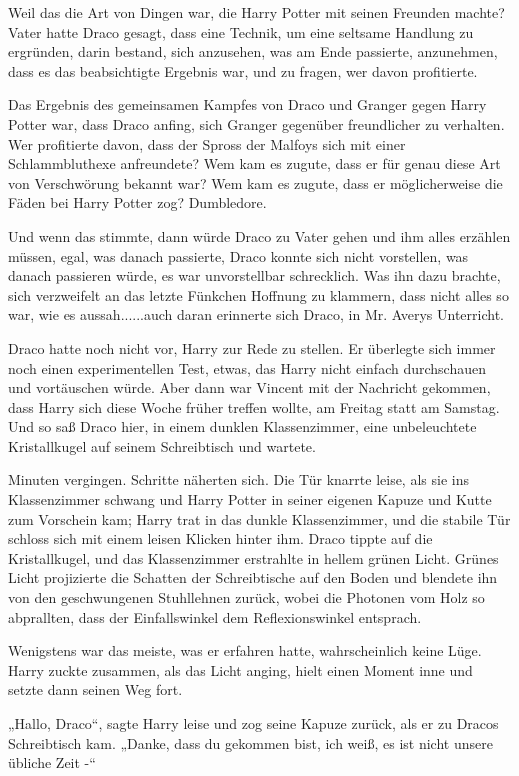 {Weil das die Art von Dingen war, die Harry Potter mit seinen Freunden machte? Vater hatte Draco gesagt, dass eine Technik, um eine seltsame Handlung zu ergründen, darin bestand, sich anzusehen, was am Ende passierte, anzunehmen, dass es das beabsichtigte Ergebnis war, und zu fragen, wer davon profitierte.

Das Ergebnis des gemeinsamen Kampfes von Draco und Granger gegen Harry Potter war, dass Draco anfing, sich Granger gegenüber freundlicher zu verhalten. Wer profitierte davon, dass der Spross der Malfoys sich mit einer Schlammbluthexe anfreundete? Wem kam es zugute, dass er für genau diese Art von Verschwörung bekannt war? Wem kam es zugute, dass er möglicherweise die Fäden bei Harry Potter zog? Dumbledore.

Und wenn das stimmte, dann würde Draco zu Vater gehen und ihm alles erzählen müssen, egal, was danach passierte, Draco konnte sich nicht vorstellen, was danach passieren würde, es war unvorstellbar schrecklich. Was ihn dazu brachte, sich verzweifelt an das letzte Fünkchen Hoffnung zu klammern, dass nicht alles so war, wie es aussah......auch daran erinnerte sich Draco, in Mr. Averys Unterricht.

Draco hatte noch nicht vor, Harry zur Rede zu stellen. Er überlegte sich immer noch einen experimentellen Test, etwas, das Harry nicht einfach durchschauen und vortäuschen würde. Aber dann war Vincent mit der Nachricht gekommen, dass Harry sich diese Woche früher treffen wollte, am Freitag statt am Samstag. Und so saß Draco hier, in einem dunklen Klassenzimmer, eine unbeleuchtete Kristallkugel auf seinem Schreibtisch und wartete.

Minuten vergingen. Schritte näherten sich. Die Tür knarrte leise, als sie ins Klassenzimmer schwang und Harry Potter in seiner eigenen Kapuze und Kutte zum Vorschein kam; Harry trat in das dunkle Klassenzimmer, und die stabile Tür schloss sich mit einem leisen Klicken hinter ihm. Draco tippte auf die Kristallkugel, und das Klassenzimmer erstrahlte in hellem grünen Licht. Grünes Licht projizierte die Schatten der Schreibtische auf den Boden und blendete ihn von den geschwungenen Stuhllehnen zurück, wobei die Photonen vom Holz so abprallten, dass der Einfallswinkel dem Reflexionswinkel entsprach.

Wenigstens war das meiste, was er erfahren hatte, wahrscheinlich keine Lüge. Harry zuckte zusammen, als das Licht anging, hielt einen Moment inne und setzte dann seinen Weg fort.

„Hallo, Draco“, sagte Harry leise und zog seine Kapuze zurück, als er zu Dracos Schreibtisch kam. „Danke, dass du gekommen bist, ich weiß, es ist nicht unsere übliche Zeit -“

}
